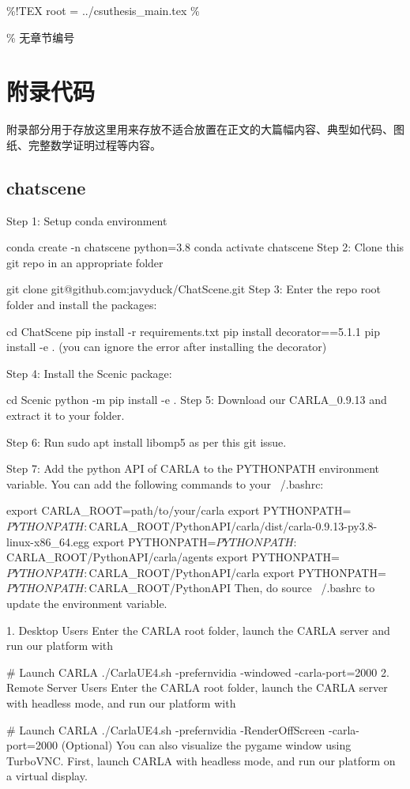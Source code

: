 \%!TEX root = ../csuthesis\_main.tex
\% \begin{appendix} \% 无章节编号
\chapter{附录代码}

附录部分用于存放这里用来存放不适合放置在正文的大篇幅内容、典型如代码、图纸、完整数学证明过程等内容。

\section{chatscene}

Step 1: Setup conda environment

conda create -n chatscene python=3.8
conda activate chatscene
Step 2: Clone this git repo in an appropriate folder

git clone git@github.com:javyduck/ChatScene.git
Step 3: Enter the repo root folder and install the packages:

cd ChatScene
pip install -r requirements.txt
pip install decorator==5.1.1
pip install -e .
(you can ignore the error after installing the decorator)

Step 4: Install the Scenic package:

cd Scenic
python -m pip install -e .
Step 5: Download our CARLA\_0.9.13 and extract it to your folder.

Step 6: Run sudo apt install libomp5 as per this git issue.

Step 7: Add the python API of CARLA to the PYTHONPATH environment variable. You can add the following commands to your ~/.bashrc:

export CARLA\_ROOT={path/to/your/carla}
export PYTHONPATH=$PYTHONPATH:${CARLA\_ROOT}/PythonAPI/carla/dist/carla-0.9.13-py3.8-linux-x86\_64.egg
export PYTHONPATH=$PYTHONPATH:${CARLA\_ROOT}/PythonAPI/carla/agents
export PYTHONPATH=$PYTHONPATH:${CARLA\_ROOT}/PythonAPI/carla
export PYTHONPATH=$PYTHONPATH:${CARLA\_ROOT}/PythonAPI
Then, do source ~/.bashrc to update the environment variable.

1. Desktop Users
Enter the CARLA root folder, launch the CARLA server and run our platform with

\# Launch CARLA
./CarlaUE4.sh -prefernvidia -windowed -carla-port=2000
2. Remote Server Users
Enter the CARLA root folder, launch the CARLA server with headless mode, and run our platform with

\# Launch CARLA
./CarlaUE4.sh -prefernvidia -RenderOffScreen -carla-port=2000
(Optional) You can also visualize the pygame window using TurboVNC. First, launch CARLA with headless mode, and run our platform on a virtual display.


\end{appendix}
